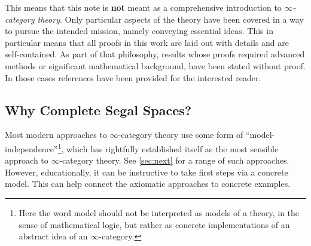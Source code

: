 \documentclass[11pt, a4paper]{amsart}
\theoremstyle{definition}
\theoremstyle{remark}
\numberwithin{equation}{section}
\begin{document}
This means that this note is \textbf{not} meant as a comprehensive introduction to \emph{$\infty$-category theory}. Only particular aspects of the theory have been covered in a way to pursue the intended mission, namely conveying essential ideas. This in particular means that all proofs in this work are laid out with details and are self-contained. As part of that philosophy, results whose proofs required advanced methods or significant mathematical background, have been stated without proof. In those cases references have been provided for the interested reader.

\subsection{Why Complete Segal Spaces?} \label{subsec:why}
Most modern approaches to $\infty$-category theory use some form of ``model-independence''\footnote{Here the word model should not be interpreted as models of a theory, in the sense of mathematical logic, but rather as concrete implementations of an abstract idea of an $\infty$-category.}, which has rightfully established itself as the most sensible approach to $\infty$-category theory. See \cref{sec:next} for a range of such approaches. However, educationally, it can be instructive to take first steps via a concrete model. This can help connect the axiomatic approaches to concrete examples.
\end{document}
